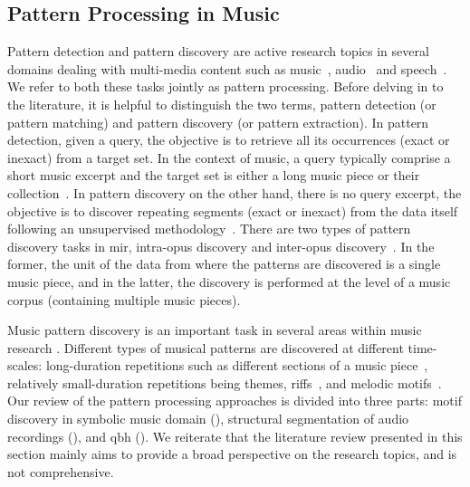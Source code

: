 \subsection{Pattern Processing in Music}
\label{sec:pattern_processin_in_music}

Pattern detection and pattern discovery are active research topics in several domains dealing with multi-media content such as music~\citep{klapuri2010pattern}, audio~\citep{Herley2006} and speech~\citep{Park2008}. We refer to both these tasks jointly as pattern processing. Before delving in to the literature, it is helpful to distinguish the two terms, pattern detection (or pattern matching) and pattern discovery (or pattern extraction). In pattern detection, given a query, the objective is to retrieve all its occurrences (exact or inexact) from a target set. In the context of music, a query typically comprise a short music excerpt and the target set is either a long music piece or their collection~\citep{ghias1995query}. In pattern discovery on the other hand, there is no query excerpt, the objective is to discover repeating segments (exact or inexact) from the data itself following an unsupervised methodology~\citep{dannenberg2003pattern}. There are two types of pattern discovery tasks in \gls{mir}, intra-opus discovery and inter-opus discovery~\citep{conklin2001representation}. In the former,\textsl{} the unit of the data from where the patterns are discovered is a single music piece, and in the latter, the discovery is performed at the level of a music corpus (containing multiple music pieces).

Music pattern discovery is an important task in several areas within music research \citep{collins2011modeling,conklin2011comparative,serra2014unsupervised,nieto2012compressing}. Different types of musical patterns are discovered at different time-scales: long-duration repetitions such as different sections of a music piece~\citep{serra2012unsupervised,Goto06TASLP}, relatively small-duration repetitions being themes, riffs~\citep{Hsu2001a}, and melodic motifs~\citep{collins2011improved}. Our review of the pattern processing approaches is divided into three parts: motif discovery in symbolic music domain (), structural segmentation of audio recordings (), and \acrfull{qbh} (). We reiterate that the literature review presented in this section mainly aims to provide a broad perspective on the research topics, and is not comprehensive.


